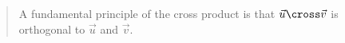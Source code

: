 \documentclass{ximera}
\author{Gregory Hartman \and Matthew Carr}
\begin{document}
\begin{exercise}
\begin{quote}
A fundamental principle of the cross product is that $\vec{u}\cross\vec{v}$ is orthogonal to $\vec{u}$ and $\vec{v}$.
\end{quote}

\begin{multipleChoice}
\end{multipleChoice}

\end{exercise}
\end{document}
